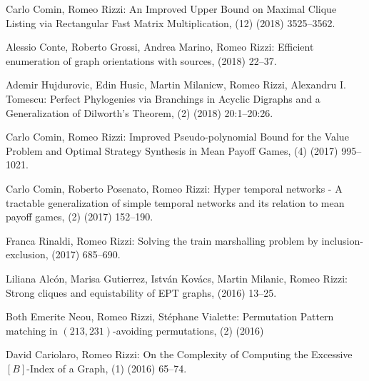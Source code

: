 \begin{etaremune}
  \item {\sc Carlo Comin, Romeo Rizzi:}
    \newblock An Improved Upper Bound on Maximal Clique Listing via Rectangular Fast Matrix Multiplication,
    (12) (2018) 3525--3562.
   
  \item {\sc Alessio Conte, Roberto Grossi, Andrea Marino, Romeo Rizzi:}
   \newblock Efficient enumeration of graph orientations with sources,
    (2018) 22--37.

  \item {\sc Ademir Hujdurovic, Edin Husic, Martin Milanicw, Romeo Rizzi, Alexandru I. Tomescu:}
   \newblock Perfect Phylogenies via Branchings in Acyclic Digraphs and a Generalization of Dilworth's Theorem,
   (2) (2018) 20:1--20:26.

  \item {\sc Carlo Comin, Romeo Rizzi:}
   \newblock Improved Pseudo-polynomial Bound for the Value Problem and Optimal Strategy Synthesis in Mean Payoff Games,
   (4) (2017) 995--1021.

  \item {\sc Carlo Comin, Roberto Posenato, Romeo Rizzi:}
   \newblock Hyper temporal networks - A tractable generalization of simple temporal networks and its relation to mean payoff games,
   (2) (2017) 152--190.

  \item {\sc Franca Rinaldi, Romeo Rizzi:}
   \newblock Solving the train marshalling problem by inclusion-exclusion,
    (2017) 685--690.

  \item {\sc Liliana Alcón, Marisa Gutierrez, István Kovács, Martin Milanic, Romeo Rizzi:}
   \newblock Strong cliques and equistability of EPT graphs,
    (2016) 13--25.

  \item {\sc Both Emerite Neou, Romeo Rizzi, Stéphane Vialette:}
   \newblock Permutation Pattern matching in $(213, 231)$-avoiding permutations,
   (2) (2016)
   
  \item {\sc David Cariolaro, Romeo Rizzi:}
   \newblock On the Complexity of Computing the Excessive $[B]$-Index of a Graph,
   (1) (2016) 65--74.


\end{etaremune}
